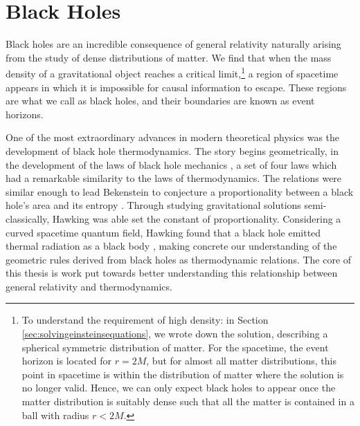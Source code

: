 \chapter{Black Holes}
\label{ch:blackholes}

Black holes are an incredible consequence of general relativity naturally arising from the study of dense distributions of matter. We find that when the mass density of a gravitational object reaches a critical limit,\footnote{To understand the requirement of high density: in Section \ref{sec:solvingeinsteinsequations}, we wrote down the \sch solution, describing a spherical symmetric distribution of matter. For the \sch spacetime, the event horizon is located for $r = 2M$, but for almost all matter distributions, this point in spacetime is within the distribution of matter where the \sch solution is no longer valid. Hence, we can only expect black holes to appear once the matter distribution is suitably dense such that all the matter is contained in a ball with radius $r < 2M$.} a region of spacetime appears in which it is impossible for causal information to escape. These regions are what we call as black holes, and their boundaries are known as event horizons. 

One of the most extraordinary advances in modern theoretical physics was the development of black hole thermodynamics. The story begins geometrically, in the development of the laws of black hole mechanics \cite{Bardeen:1973gs, Hawking:1971vc}, a set of four laws which had a remarkable similarity to the laws of thermodynamics. The relations were similar enough to lead Bekenstein to conjecture a proportionality between a black hole's area and its entropy \cite{Bekenstein:1973ur}. Through studying gravitational solutions semi-classically, Hawking was able set the constant of proportionality. Considering a curved spacetime quantum field, Hawking found that a black hole emitted thermal radiation as a black body \cite{Hawking:1974sw}, making concrete our understanding of the geometric rules derived from black holes as thermodynamic relations. The core of this thesis is work put towards better understanding this relationship between general relativity and thermodynamics. 


